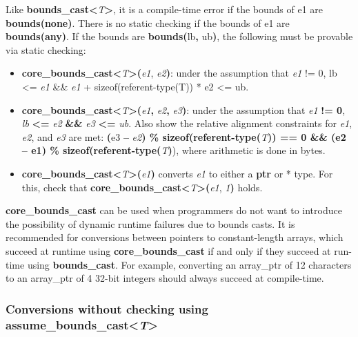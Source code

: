 \documentclass[]{article}
\begin{document}
Like \textbf{bounds\_cast\textless{}}\emph{T}\textbf{\textgreater{}}, it
is a compile-time error if the bounds of e1 are \textbf{bounds(none)}.
There is no static checking if the bounds of e1 are
\textbf{bounds(any)}. If the bounds are \textbf{bounds(}lb\textbf{,}
ub\textbf{)}, the following must be provable via static checking:

\begin{itemize}
\item
  \textbf{core\_bounds\_cast\textless{}}\emph{T}\textbf{\textgreater{}(}\emph{e1},
  \emph{e2}\textbf{)}: under the assumption that \emph{e1} != 0, lb
  \textless{}= \emph{e1} \&\& \emph{e1} + sizeof(referent-type(T)) * e2
  \textless{}= ub.
\item
  \textbf{core\_bounds\_cast\textless{}}\emph{T}\textbf{\textgreater{}(}\emph{e1}\textbf{,}
  \emph{e2}\textbf{,} \emph{e3}\textbf{)}: under the assumption that
  \emph{e1} \textbf{!= 0}, \emph{lb} \textbf{\textless{}=} \emph{e2}
  \textbf{\&\&} \emph{e3} \textbf{\textless{}=} \emph{ub}. Also show the
  relative alignment constraints for \emph{e1}, \emph{e2}, and \emph{e3}
  are met: \textbf{(}e3 \textbf{--} \emph{e2}\textbf{) \%
  sizeof(referent-type(}\emph{T}\textbf{)) == 0 \&\& (e2 -- e1) \%
  sizeof(referent-type(}\emph{T}\textbf{)}), where arithmetic is done in
  bytes.
\item
  \textbf{core\_bounds\_cast\textless{}}\emph{T}\textbf{\textgreater{}(}\emph{e1}\textbf{)}
  converts \emph{e1} to either a \textbf{ptr} or * type. For this, check
  that
  \textbf{core\_bounds\_cast\textless{}}\emph{T}\textbf{\textgreater{}(}\emph{e1},
  \emph{1}\textbf{)} holds.
\end{itemize}

\textbf{core\_bounds\_cast} can be used when programmers do not want to
introduce the possibility of dynamic runtime failures due to bounds
casts. It is recommended for conversions between pointers to
constant-length arrays, which succeed at runtime using
\textbf{core\_bounds\_cast} if and only if they succeed at run-time
using \textbf{bounds\_cast}. For example, converting an array\_ptr of 12
characters to an array\_ptr of 4 32-bit integers should always succeed
at compile-time.

\subsubsection{\texorpdfstring{\protect\hypertarget{ux5fToc437460800}{}{\protect\hypertarget{ux5fToc440445481}{}{\protect\hypertarget{ux5fToc440449263}{}{\protect\hypertarget{ux5fToc440551913}{}{}}}}Conversions
without checking using
assume\_bounds\_cast\textless{}\emph{T}\textgreater{}}{Conversions without checking using assume\_bounds\_cast\textless{}T\textgreater{}}}\label{conversions-without-checking-using-assumeux5fboundsux5fcastt}
\end{document}
